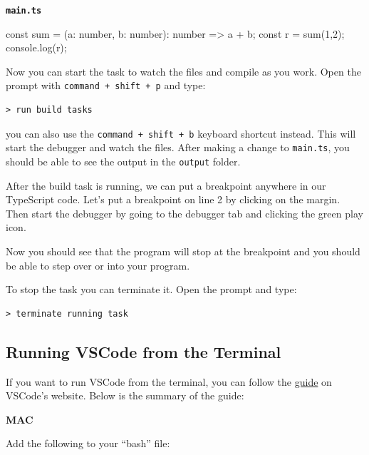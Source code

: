 \documentclass[12pt,]{article}
\newenvironment{Shaded}{}{}
\newcommand{\DataTypeTok}[1]{{#1}}
\newcommand{\DecValTok}[1]{{#1}}
\newcommand{\FunctionTok}[1]{{#1}}
\newcommand{\NormalTok}[1]{{#1}}
\begin{document}
\textbf{\texttt{main.ts}}

\begin{Shaded}
\begin{Highlighting}[numbers=left,,]
\DataTypeTok{const} \NormalTok{sum = (a: number, b: number): number => a + b;}
\DataTypeTok{const} \NormalTok{r = }\FunctionTok{sum}\NormalTok{(}\DecValTok{1}\NormalTok{,}\DecValTok{2}\NormalTok{);}
\NormalTok{console.}\FunctionTok{log}\NormalTok{(r);}
\end{Highlighting}
\end{Shaded}

Now you can start the task to watch the files and compile as you work.
Open the prompt with \texttt{command\ +\ shift\ +\ p} and type:

\begin{verbatim}
> run build tasks
\end{verbatim}

you can also use the \texttt{command\ +\ shift\ +\ b} keyboard shortcut
instead. This will start the debugger and watch the files. After making
a change to \texttt{main.ts}, you should be able to see the output in
the \texttt{output} folder.

After the build task is running, we can put a breakpoint anywhere in our
TypeScript code. Let's put a breakpoint on line 2 by clicking on the
margin. Then start the debugger by going to the debugger tab and
clicking the green play icon.

Now you should see that the program will stop at the breakpoint and you
should be able to step over or into your program.

To stop the task you can terminate it. Open the prompt and type:

\begin{verbatim}
> terminate running task
\end{verbatim}

\subsection{Running VSCode from the
Terminal}\label{running-vscode-from-the-terminal}

If you want to run VSCode from the terminal, you can follow the
\href{https://code.visualstudio.com/Docs/editor/setup}{guide} on
VSCode's website. Below is the summary of the guide:

\textbf{MAC}

Add the following to your ``bash'' file:
\end{document}
